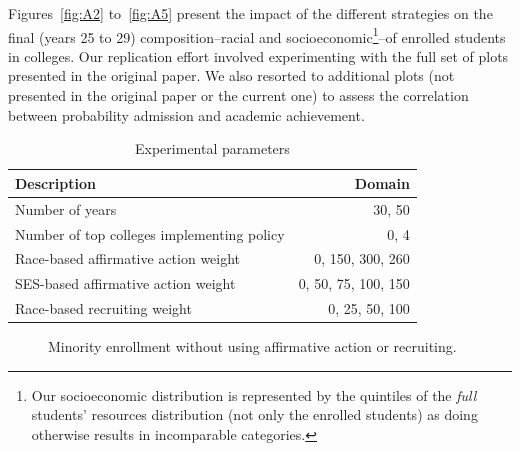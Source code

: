 Figures~\ref{fig:A2} to~\ref{fig:A5} present the impact of the different strategies on the final (years 25 to 29) composition--racial and socioeconomic\footnote{Our socioeconomic distribution is represented by the quintiles of the \emph{full} students' resources distribution (not only the enrolled students) as doing otherwise results in incomparable categories.}--of enrolled students in colleges. %
Our replication effort involved experimenting with the full set of plots presented in the original paper.
We also resorted to additional plots (not presented in the original paper or the current one) to assess the correlation between probability admission and academic achievement.

\begin{table}[!ht]
    \centering
    \begin{tabular}{l r} \toprule
        \textbf{Description} & \textbf{Domain} \\ \midrule
        Number of years & 30, 50 \\
        Number of top colleges implementing policy & 0, 4 \\
        Race-based affirmative action weight & 0, 150, 300, 260 \\
        SES-based affirmative action weight & 0, 50, 75, 100, 150 \\
        Race-based recruiting weight & 0, 25, 50, 100 \\ \bottomrule
    \end{tabular}
    \caption{Experimental parameters}
    \label{tab:exp}
\end{table}


\begin{figure}[p]
  \centering
  \hfill%
  \caption{Minority enrollment without using affirmative action or recruiting.}
  \label{fig:c1}
\end{figure}

